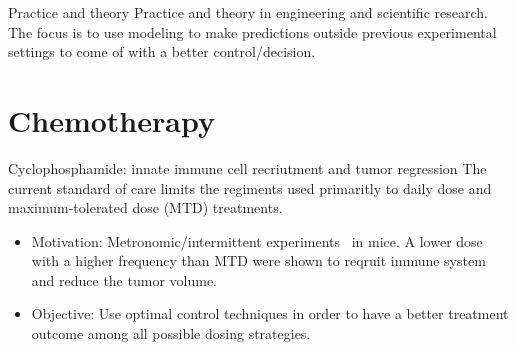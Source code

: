 \documentclass[10pt]{beamer}
\newcommand\myscalefactor{0.5}
\begin{document}
\begin{frame}{Practice and theory}
	Practice and theory in engineering and scientific research. The focus is to use modeling to make predictions outside previous experimental settings to come of with a better control/decision. \\
	\vspace{0.5cm}
		  \hspace{1cm}
\end{frame}

\section{Chemotherapy}

\begin{frame}{Cyclophosphamide: innate immune cell recriutment and tumor regression}
	The current standard of care limits the regiments used primaritly to daily dose and maximum-tolerated dose (MTD) treatments.
	\vspace{1cm}
	\begin{itemize}
		\item Motivation: Metronomic/intermittent experiments~ in mice. A lower dose with a higher frequency than MTD were shown to reqruit immune system and reduce the tumor volume.
		\vspace{0.5cm}
		\item Objective: Use optimal control techniques in order to have a better treatment outcome among all possible dosing strategies.
	\end{itemize}
\end{frame}
\end{document}
